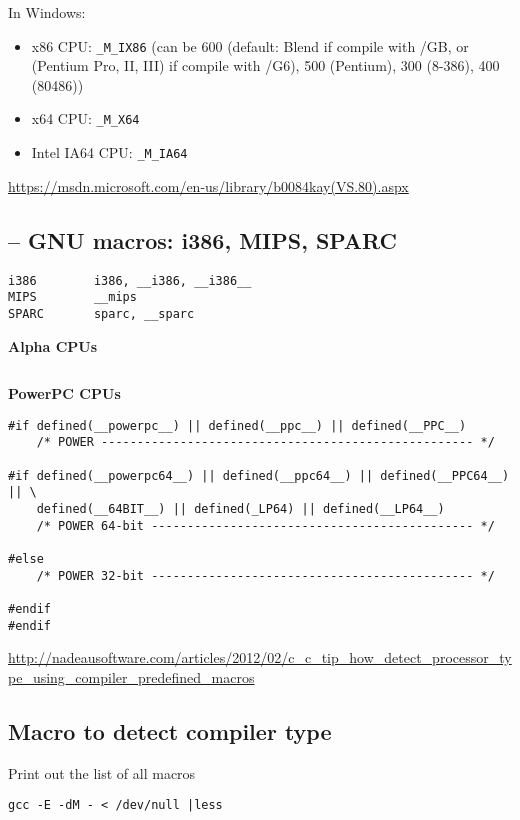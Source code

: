 In Windows:
\begin{itemize}
  
  \item x86 CPU: \verb!_M_IX86! (can be 600 (default: Blend if compile with /GB,
  or (Pentium Pro, II, III) if compile with /G6), 500 (Pentium), 300 (8-386),
  400 (80486))
  
  
  \item x64 CPU: \verb!_M_X64!
  
  
  \item Intel IA64 CPU: \verb!_M_IA64!
\end{itemize}
\url{https://msdn.microsoft.com/en-us/library/b0084kay(VS.80).aspx}


\subsection{-- GNU macros: i386, MIPS, SPARC}
\label{sec:macro-GNU-to-detect-CPU}

\begin{verbatim}
i386        i386, __i386, __i386__
MIPS        __mips
SPARC       sparc, __sparc
\end{verbatim}

{\bf Alpha CPUs}
\begin{verbatim}

\end{verbatim}

{\bf PowerPC CPUs}
\begin{verbatim}
#if defined(__powerpc__) || defined(__ppc__) || defined(__PPC__)
	/* POWER ---------------------------------------------------- */

#if defined(__powerpc64__) || defined(__ppc64__) || defined(__PPC64__) || \
	defined(__64BIT__) || defined(_LP64) || defined(__LP64__)
	/* POWER 64-bit --------------------------------------------- */

#else
	/* POWER 32-bit --------------------------------------------- */

#endif
#endif
\end{verbatim}
\url{http://nadeausoftware.com/articles/2012/02/c_c_tip_how_detect_processor_type_using_compiler_predefined_macros}

\subsection{Macro to detect compiler type}
\label{sec:macro-detect-compiler}

Print out the list of all macros
\begin{verbatim}
gcc -E -dM - < /dev/null |less
\end{verbatim}

